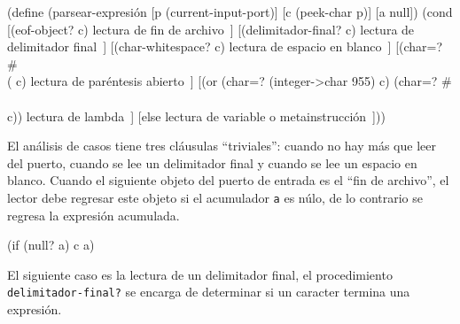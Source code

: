 \documentclass[letterpaper,twoside,openright,10pt]{book}
\begin{document}
\nwenddocs{}\plusendmoddef
(define (parsear-expresión [p (current-input-port)]
                           [c (peek-char p)]
                           [a null])
  (cond
   [(eof-object? c)
    \LA{}lectura de fin de archivo~{\nwtagstyle{}}\RA{}]
   [(delimitador-final? c)
    \LA{}lectura de delimitador final~{\nwtagstyle{}}\RA{}]
   [(char-whitespace? c)
    \LA{}lectura de espacio en blanco~{\nwtagstyle{}}\RA{}]
   [(char=? #\\( c)
    \LA{}lectura de paréntesis abierto~{\nwtagstyle{}}\RA{}]
   [(or (char=? (integer->char 955) c)
        (char=? #\\\\ c))
    \LA{}lectura de lambda~{\nwtagstyle{}}\RA{}]
   [else
    \LA{}lectura de variable o metainstrucción~{\nwtagstyle{}}\RA{}]))

\eatline
{}\nwendcode{}\nwdocspar

El análisis de casos tiene tres cláusulas ``triviales'': cuando no hay más que leer del puerto, cuando se lee un delimitador final y cuando se lee un espacio en blanco. Cuando el siguiente objeto del puerto de entrada es el ``fin de archivo'', el lector debe regresar este objeto si el acumulador {\tt{}a} es núlo, de lo contrario se regresa la expresión acumulada.

\nwenddocs{}\endmoddef
(if (null? a) c a)
\nwendcode{}\nwdocspar

El siguiente caso es la lectura de un delimitador final, el procedimiento {\tt{}\protect{}delimitador-final?} se encarga de determinar si un caracter termina una expresión.
\end{document}
